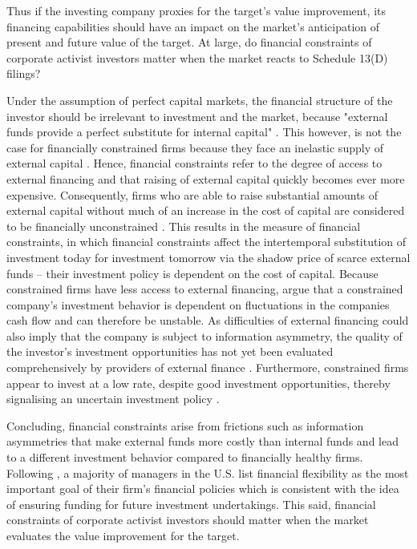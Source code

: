 \documentclass[12pt]{article}
\begin{document}
Thus if the investing company proxies for the target's value improvement, its financing capabilities should have an impact on the market's anticipation of present and future value of the target. At large, do financial constraints of corporate activist investors matter when the market reacts to Schedule 13(D) filings?\par
Under the assumption of perfect capital markets, the financial structure of the investor should be irrelevant to investment and the market, because "external funds provide a perfect substitute for internal capital" \citep[p. 141]{Fazzari1988}. This however, is not the case for financially constrained firms because they face an inelastic supply of external capital \citep[p.1]{Farre-mensa2013}. Hence, financial constraints refer to the degree of access to external financing and that raising of external capital quickly becomes ever more expensive. Consequently, firms who are able to raise substantial amounts of external capital without much of an increase in the cost of capital are considered to be financially unconstrained \citep[p.1]{Farre-mensa2013}. This results in the \citet[p.531]{Whited2006} measure of financial constraints, in which financial constraints affect the intertemporal substitution of investment today for investment tomorrow via the shadow price of scarce external funds -- their investment policy is dependent on the cost of capital. Because constrained firms have less access to external financing, \citet[p. 142]{Fazzari1988} argue that a constrained company's investment behavior is dependent on fluctuations in the companies cash flow and can therefore be unstable. As difficulties of external financing could also imply that the company is subject to information asymmetry, the quality of the investor's investment opportunities has not yet been evaluated comprehensively by providers of external finance \citep[p.142]{Fazzari1988}. Furthermore, constrained firms appear to invest at a low rate, despite good investment opportunities, thereby signalising an uncertain investment policy \citep[p.533]{Whited2006}.\par
Concluding, financial constraints arise from frictions such as information asymmetries that make external funds more costly than internal funds and lead to a different investment behavior compared to financially healthy firms. Following \citet[p.691]{Almeida2011}, a majority of managers in the U.S. list financial flexibility as the most important goal of their firm's financial policies which is consistent with the idea of ensuring funding for future investment undertakings. This said, financial constraints of corporate activist investors should matter when the market evaluates the value improvement for the target.
\end{document}
